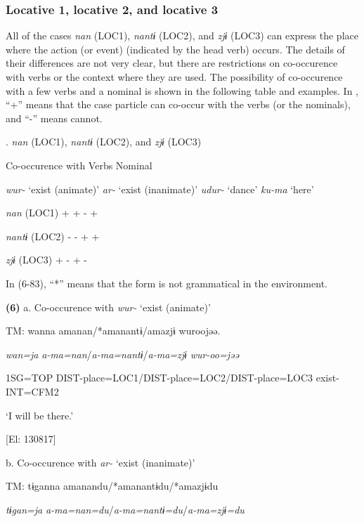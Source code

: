 \subsubsection{Locative 1, locative 2, and locative 3}

All of the cases \textit{nan} (LOC1), \textit{nantɨ} (LOC2), and \textit{zjɨ} (LOC3) can express the place where the action (or event) (indicated by the head verb) occurs. The details of their differences are not very clear, but there are restrictions on co-occurence with verbs or the context where they are used. The possibility of co-occurence with a few verbs and a nominal is shown in the following table and examples. In , “+” means that the case particle can co-occur with the verbs (or the nominals), and “-” means cannot.

\begin{styleBeschriftung}
\textmd{.} \textmd{\textit{nan}}\textmd{ (LOC1),} \textmd{\textit{nantɨ}}\textmd{ (LOC2), and} \textmd{\textit{zjɨ}}\textmd{ (LOC3)}
\end{styleBeschriftung}

Co-occurence with  Verbs        Nominal

    \textit{wur-} ‘exist (animate)’  \textit{ar-} ‘exist (inanimate)’  \textit{udur-} ‘dance’    \textit{ku-ma} ‘here’

\textit{nan}  (LOC1)  +  +  {}-    +

\textit{nantɨ}  (LOC2)  {}-  {}-  +    +

\textit{zjɨ}  (LOC3)  +  {}-  +    {}-

In (6-83), “*” means that the form is not grammatical in the environment.

\textbf{(6)}  a. Co-occurence with \textit{wur-} ‘exist (animate)’

  TM:  wanna  amanan/*amanantɨ/amazjɨ  wuroojəə.

    \textit{wan=ja}  \textit{a-ma=nan}/\textit{a-ma=nantɨ}/\textit{a-ma=zjɨ}  \textit{wur-oo=jəə}

    1SG=TOP  DIST-place=LOC1/DIST-place=LOC2/DIST-place=LOC3  exist-INT=CFM2

    ‘I will be there.’

    [El: 130817]

  b. Co-occurence with \textit{ar-} ‘exist (inanimate)’

  TM:  tɨganna  amanandu/*amanantɨdu/*amazjɨdu

    \textit{tɨgan=ja}  \textit{a-ma=nan=du}/\textit{a-ma=nantɨ=du}/\textit{a-ma=zjɨ=du}

